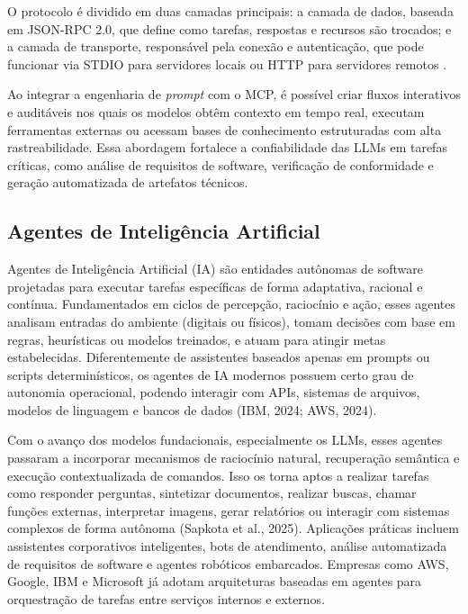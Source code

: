 O protocolo é dividido em duas camadas principais: a camada de dados, baseada em JSON-RPC 2.0, que define como tarefas, respostas e recursos são trocados; e a camada de transporte, responsável pela conexão e autenticação, que pode funcionar via STDIO para servidores locais ou HTTP para servidores remotos .

Ao integrar a engenharia de \textit{prompt} com o MCP, é possível criar fluxos interativos e auditáveis nos quais os modelos obtêm contexto em tempo real, executam ferramentas externas ou acessam bases de conhecimento estruturadas com alta rastreabilidade. Essa abordagem fortalece a confiabilidade das LLMs em tarefas críticas, como análise de requisitos de software, verificação de conformidade e geração automatizada de artefatos técnicos.


\subsection{Agentes de Inteligência Artificial}


Agentes de Inteligência Artificial (IA) são entidades autônomas de software projetadas para executar tarefas específicas de forma adaptativa, racional e contínua. Fundamentados em ciclos de percepção, raciocínio e ação, esses agentes analisam entradas do ambiente (digitais ou físicos), tomam decisões com base em regras, heurísticas ou modelos treinados, e atuam para atingir metas estabelecidas. Diferentemente de assistentes baseados apenas em prompts ou scripts determinísticos, os agentes de IA modernos possuem certo grau de autonomia operacional, podendo interagir com APIs, sistemas de arquivos, modelos de linguagem e bancos de dados (IBM, 2024; AWS, 2024).

Com o avanço dos modelos fundacionais, especialmente os LLMs, esses agentes passaram a incorporar mecanismos de raciocínio natural, recuperação semântica e execução contextualizada de comandos. Isso os torna aptos a realizar tarefas como responder perguntas, sintetizar documentos, realizar buscas, chamar funções externas, interpretar imagens, gerar relatórios ou interagir com sistemas complexos de forma autônoma (Sapkota et al., 2025). Aplicações práticas incluem assistentes corporativos inteligentes, bots de atendimento, análise automatizada de requisitos de software e agentes robóticos embarcados. Empresas como AWS, Google, IBM e Microsoft já adotam arquiteturas baseadas em agentes para orquestração de tarefas entre serviços internos e externos.

